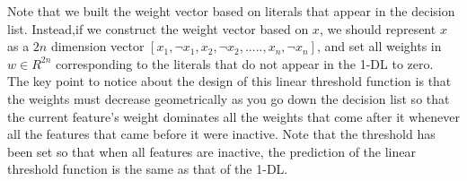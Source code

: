 \begin{enumerate}
\begin{solution}
Note that we built the weight vector based on literals that appear in the decision list. Instead,if we construct the weight vector based on $x$, we should represent $x$ as a $2n$ dimension vector
$[x_1,\neg x_1, x_2,\neg x_2,....., x_n,\neg x_n]$, and set all weights in $w \in R^{2n}$ corresponding to the literals that do not appear in the 1-DL to zero.\\
The key point to notice about the design of this linear threshold function is that the weights must decrease geometrically as you go down the decision list so that the current feature's weight dominates all the weights that come after it whenever all the features that came before it were inactive. Note that the threshold has been set so that when all features are inactive, the prediction of the linear threshold function is the same as that of the 1-DL.
\end{solution}
\end{enumerate}



